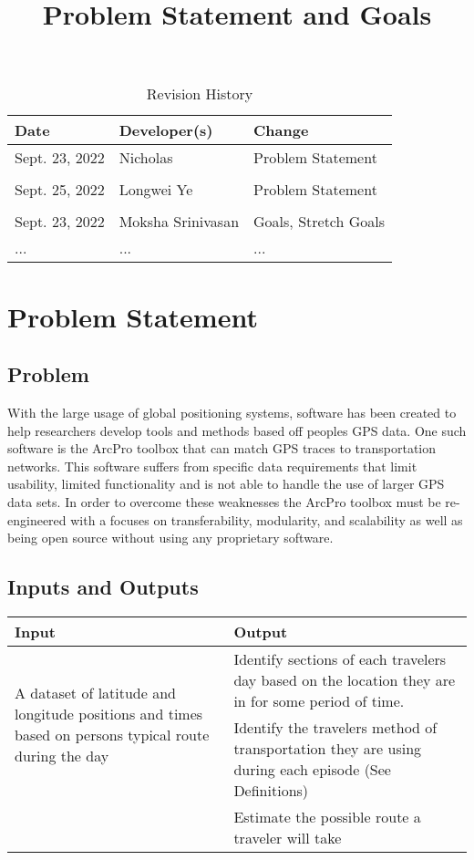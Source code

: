 \documentclass{article}
\title{Problem Statement and Goals\\\progname}
\author{\authname}
\date{}
\begin{document}
\maketitle

\begin{table}[hp]
\caption{Revision History} \label{TblRevisionHistory}
\begin{tabularx}{\textwidth}{llX}
\toprule
\textbf{Date} & \textbf{Developer(s)} & \textbf{Change}\\
\midrule
Sept. 23, 2022 & Nicholas & Problem Statement\\\\
Sept. 25, 2022 & Longwei Ye & Problem Statement\\\\
Sept. 23, 2022 & Moksha Srinivasan & Goals, Stretch Goals\\
... & ... & ...\\
\bottomrule
\end{tabularx}
\end{table}
\newpage
\section{Problem Statement}



\subsection{Problem}
With the large usage of global positioning systems, software has been created to help researchers develop tools and methods based off peoples GPS data. 
One such software is the ArcPro toolbox that can match GPS traces to transportation networks. This software suffers from specific data requirements that limit usability, 
limited functionality and is not able to handle the use of larger GPS data sets. In order to overcome these weaknesses the ArcPro toolbox must be re-engineered with a focuses 
on transferability, modularity, and scalability as well as being open source without using any proprietary software. 

\subsection{Inputs and Outputs}
\begin{table}[h]
    \centering
    \begin{tabular}{|p{6cm}|p{6cm}|}
    \hline
    Input & Output  \\
    \hline
    \multirow{2}{5cm}{A dataset of latitude and longitude positions and times based on persons typical route during the day} & Identify sections of each travelers day based on the location they are in for some period of time.  \\\cline{2-2} 
    & Identify the travelers method of transportation they are using during each episode (See Definitions)  \\\cline{2-2} 
    & Estimate the possible route a traveler will take\\\cline{2-2} 
    \hline
    \end{tabular}
\end{table}
\end{document}
